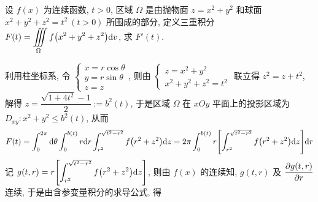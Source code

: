 \begin{example}
    设 $f(x)$ 为连续函数, $t>0$, 区域 $\Omega$ 是由抛物面 $z=x^2+y^2$ 和球面 $x^2+y^2+z^2=t^2~ (t>0)$ 所围成的部分, 定义三重积分 $\displaystyle F(t)=\iiint\limits_{\Omega}f\qty(x^2+y^2+z^2)\dd v$, 求 $F'(t).$
\end{example}
\begin{solution}
    利用柱坐标系, 令 $\begin{cases}
            x=r\cos\theta \\ y=r\sin\theta\\ z=z
        \end{cases}$, 则由 $\begin{cases}
            z=x^2+y^2 \\ x^2+y^2+z^2=t^2
        \end{cases}$ 联立得 $z^2=z+t^2$, 解得 $z=\dfrac{\sqrt{1+4t^2}-1}{2}:=b^2(t)$, 
    于是区域 $\Omega$ 在 $xOy$ 平面上的投影区域为 $D_{xy}:x^2+y^2\leqslant b^2(t)$, 从而
    $$F(t)=\int_{0}^{2\pi}\dd \theta\int_{0}^{b(t)}r\dd r\int_{r^2}^{\sqrt{t^2-r^2}}f\qty(r^2+z^2)\dd z=2\pi\int_{0}^{b(t)}r\qty[\int_{r^2}^{\sqrt{t^2-r^2}}f\qty(r^2+z^2)\dd z]\dd r$$
    记 $\displaystyle g(t,r)=r\qty[\int_{r^2}^{\sqrt{t^2-r^2}}f\qty(r^2+z^2)\dd z]$, 则由 $f(x)$ 的连续知,  $g(t,r)$ 及 $\displaystyle\pdv{g(t,r)}{r}$ 连续, 
    于是由含参变量积分的求导公式, 得
\end{solution}

